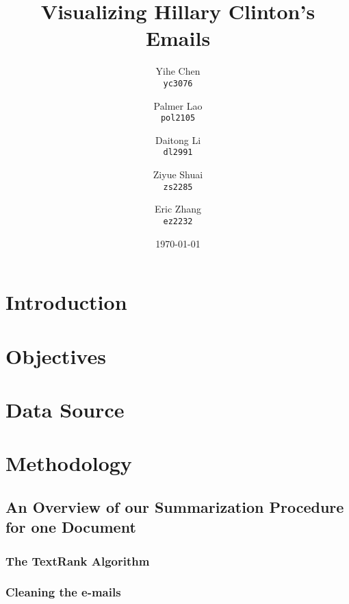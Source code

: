 \documentclass[11pt]{article}
\begin{document}
\title{Visualizing Hillary Clinton's Emails}

\author{
  Yihe Chen \\
  \texttt{yc3076}
  \and 
  Palmer Lao \\
  \texttt{pol2105}
  \and
  Daitong Li \\
  \texttt{dl2991}
  \and
  Ziyue Shuai \\
  \texttt{zs2285}
  \and
  Eric Zhang \\ 
  \texttt{ez2232}
}

\date{\today}
\maketitle
\doublespacing


\section{Introduction}


\section{Objectives}


\section{Data Source}



\section{Methodology}

\subsection{An Overview of our Summarization Procedure for one Document}


\subsubsection{The TextRank Algorithm}


\subsubsection{Cleaning the e-mails}

\end{document}
